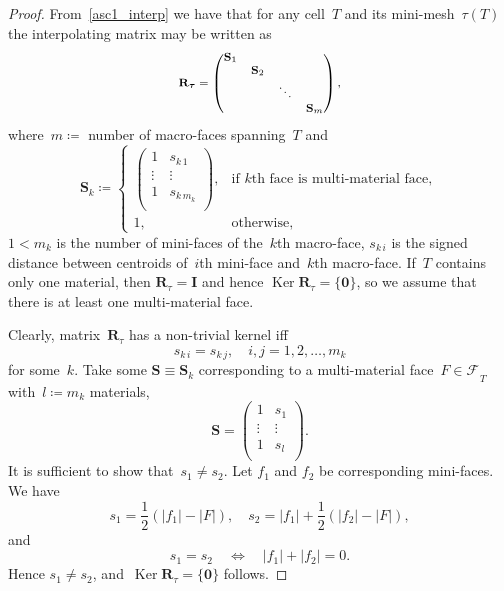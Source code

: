 \documentclass[12pt]{article}
\newcommand{\vect}[1]{\boldsymbol{\mathbf{#1}}}
\newcommand{\bcell}{T}
\newcommand{\mmesh}{{\vect{\mathcal \tau}}}
\newcommand{\bfaces}[1][]{{\vect{\mathcal F}_{\text{#1}}}}
\DeclareMathOperator{\Ker}{Ker}
\begin{document}
\begin{proof}
	From~\eqref{asc1_interp} we have that for any cell~$\bcell$ and its mini-mesh~$\mmesh(T)$
	the interpolating matrix may be written as
	\begin{equation}\label{r_wo_mixed}\footnotesize
		\vect R_\mmesh =
		\begin{pmatrix}
			\vect S_1 & & & \\
			& \vect S_2 & & \\
			& & \ddots & \\
			& & & \vect S_m
		\end{pmatrix},
	\end{equation}
	where~$m \coloneqq$ number of macro-faces spanning~$\bcell$ and
	\begin{equation*}
		\vect S_k \coloneqq
		\begin{cases}
			\begin{pmatrix}
				1 &  s_{k\,1} \\
				\vdots & \vdots \\
				1 &  s_{k\,m_k} \\
			\end{pmatrix}, & \text{if }k\text{th face is multi-material face}, \\
			1, & \text{otherwise},
		\end{cases}
	\end{equation*}
	$1 < m_k$ is the number of mini-faces of the~$k$th macro-face, $ s_{k\,i}$ is the signed distance between centroids of~$i$th mini-face and~$k$th macro-face. If~$\bcell$ contains only one material, then $\vect R_\mmesh = \vect I$ and hence $\Ker\vect R_\mmesh = \{ {\vect 0} \}$, so we assume that there is at least one multi-material  face.
		
	Clearly, matrix~$\vect R_\mmesh$ has a non-trivial kernel iff
	\begin{equation*}
		 s_{k\,i} =  s_{k\,j}, \quad i, j = 1, 2, \dots, m_k
	\end{equation*}
	for some~$k$. Take some $\vect S \equiv \vect S_k$ corresponding to a multi-material face~$F \in \bfaces_\bcell$ with~${l \coloneqq m_k}$ materials,
	\begin{equation*}
		\vect S = \begin{pmatrix}
			1 &  s_1 \\
			\vdots & \vdots \\
			1 &  s_l \\
		\end{pmatrix}.
	\end{equation*}
	It is sufficient to show that~$ s_1 \ne  s_2$. Let $f_1$ and $f_2$ be corresponding mini-faces. We have
	\[
		 s_1 = \frac{1}{2}\left( |f_1| - |F| \right), \quad
		 s_2 = |f_1| + \frac{1}{2}\left( |f_2| - |F| \right),
	\]
	and
	\begin{equation*}
		 s_1 =  s_2 \quad\Leftrightarrow\quad |f_1| + |f_2| = 0.
	\end{equation*}
	Hence $ s_1 \ne  s_2$, and~$\Ker\vect R_\mmesh = \{ {\vect 0} \}$ follows.
\end{proof}
\end{document}
